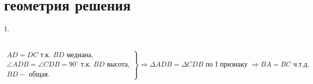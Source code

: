 \documentclass[12pt]{article}
\begin{document}
\section{геометрия решения}
1. \begin{figure}[ht!]
\end{figure}\\
$\left.\begin{array}{l}AD=DC\text{ т.к. }BD\text{ медиана,}\\
\angle ADB=\angle CDB=90^\circ \text{ т.к. }BD\text{ высота,}\\
BD - \text{ общая.}   \end{array}\right\}\Rightarrow
\Delta ADB=\Delta CDB\text{ по I признаку }\Rightarrow BA=BC\text{ ч.т.д.} $\\
\end{document}
